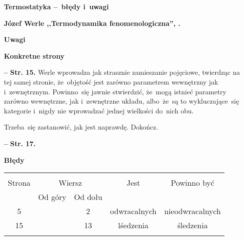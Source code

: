 \documentclass[a4paper,11pt]{article}
\newcommand{\spaceOne}{2em}
\newcommand{\spaceThree}{0.5em}
\newcommand{\tb}{\textbf}
\newcommand{\noi}{\noindent}
\newcommand{\start}{\noi \tb{--} {}}
\newcommand{\Str}[1]{\tb{Str. #1.}}
\newcommand{\Center}[1]{\begin{center} #1 \end{center}}
\newcommand{\CenterTB}[1]{\Center{\tb{#1}}}
\newcommand{\Dok}{{\color{red} Dokończ.}}
\newcommand{\Field}[1]{ \begin{center} {\Large \tb{#1} } \end{center} }
\newcommand{\Work}[1]{ \begin{center} {\large \tb{#1}} \end{center} }
\begin{document}



\Field{Termostatyka --~błędy i~uwagi}

\vspace{\spaceOne}



\Work{
  Józef Werle ,,Termodynamika fenomenologiczna'', \cite{Wer57}. }

\CenterTB{Uwagi}

\noi \tb{Konkretne strony}

\vspace{\spaceThree}

\start \Str{15} Werle wprowadza jak strasznie zamieszanie pojęciowe,
twierdząc na tej samej stronie, że~objętość jest zarówno parametrem
wewnętrzny jak i~zewnętrznym. Powinno~się jawnie stwierdzić, że~mogą
istnieć parametry zarówno wewnętrzne, jak i~zewnętrzne układu,
albo~że~są to wykluczające~się kategorie i~nigdy nie wprowadzać
jednej wielkości do~nich obu.

Trzeba~się zastanowić, jak jest naprawdę. \Dok

\start \Str{17}


\CenterTB{Błędy}
\begin{center}
  \begin{tabular}{|c|c|c|c|c|}
    \hline
    & \multicolumn{2}{c|}{} & & \\
    Strona & \multicolumn{2}{c|}{Wiersz} & Jest & Powinno być
    \\ \cline{2-3}
    & Od góry & Od dołu &  &  \\ \hline
    5 & & 2 & odwracalnych & nieodwracalnych \\
    15 & & 13 & lśedzenia & śledzenia \\
    & & & & \\ \hline
  \end{tabular}
\end{center}
\end{document}
